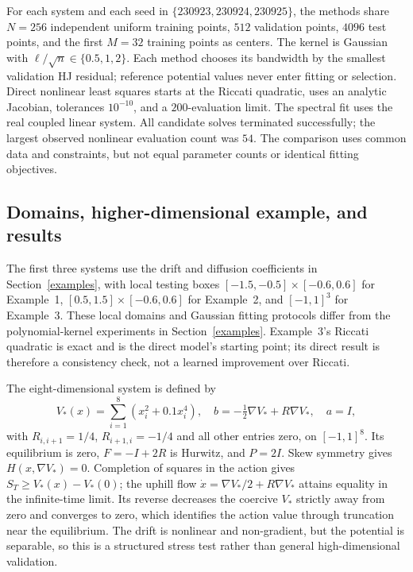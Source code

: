 \documentclass[11pt]{article}
\theoremstyle{plain}      %
\theoremstyle{definition} %
\begin{document}
For each system and each seed in $\{230923,230924,230925\}$, the methods share $N=256$ independent uniform training points, $512$ validation points, $4096$ test points, and the first $M=32$ training points as centers. The kernel is Gaussian with $\ell/\sqrt n\in\{0.5,1,2\}$. Each method chooses its bandwidth by the smallest validation HJ residual; reference potential values never enter fitting or selection. Direct nonlinear least squares starts at the Riccati quadratic, uses an analytic Jacobian, tolerances $10^{-10}$, and a $200$-evaluation limit. The spectral fit uses the real coupled linear system. All candidate solves terminated successfully; the largest observed nonlinear evaluation count was $54$. The comparison uses common data and constraints, but not equal parameter counts or identical fitting objectives.

\subsection{Domains, higher-dimensional example, and results}\label{app:accuracy}
The first three systems use the drift and diffusion coefficients in Section~\ref{examples}, with local testing boxes $[-1.5,-0.5]\times[-0.6,0.6]$ for Example~1, $[0.5,1.5]\times[-0.6,0.6]$ for Example~2, and $[-1,1]^3$ for Example~3. These local domains and Gaussian fitting protocols differ from the polynomial-kernel experiments in Section~\ref{examples}. Example~3's Riccati quadratic is exact and is the direct model's starting point; its direct result is therefore a consistency check, not a learned improvement over Riccati.

The eight-dimensional system is defined by
\begin{equation}\label{eq:appendix-eight}
 V_*(x)=\sum_{i=1}^8(x_i^2+0.1x_i^4),\quad
 b=-\tfrac12\nabla V_*+R\nabla V_*,\quad a=I,
\end{equation}
with $R_{i,i+1}=1/4$, $R_{i+1,i}=-1/4$ and all other entries zero, on $[-1,1]^8$. Its equilibrium is zero, $F=-I+2R$ is Hurwitz, and $P=2I$. Skew symmetry gives $H(x,\nabla V_*)=0$. Completion of squares in the action gives $S_T\geq V_*(x)-V_*(0)$; the uphill flow $\dot x=\nabla V_*/2+R\nabla V_*$ attains equality in the infinite-time limit. Its reverse decreases the coercive $V_*$ strictly away from zero and converges to zero, which identifies the action value through truncation near the equilibrium. The drift is nonlinear and non-gradient, but the potential is separable, so this is a structured stress test rather than general high-dimensional validation.
\end{document}
